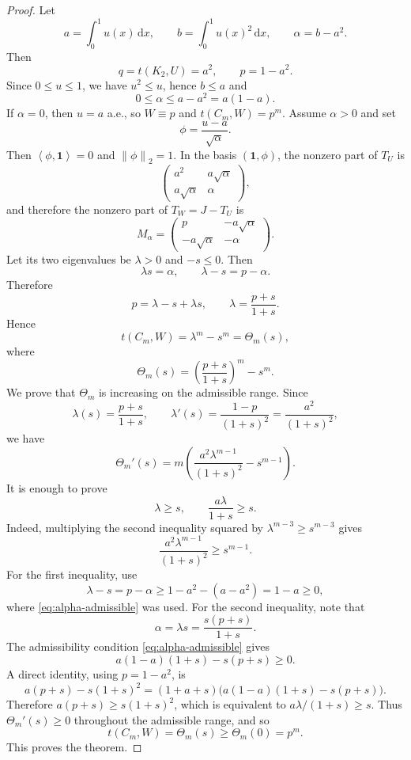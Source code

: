 \documentclass[11pt]{article}
\theoremstyle{definition}
\theoremstyle{remark}
\newcommand{\one}{\mathbf 1}
\newcommand{\ip}[2]{\left\langle #1,#2\right\rangle}
\newcommand{\norm}[1]{\left\lVert #1\right\rVert}
\newcommand{\dd}{\,\mathrm d}
\newcommand{\0}{\mathbf 0}
\begin{document}
\begin{proof}
Let
\[
        a=\int_0^1 u(x)\dd x,
        \qquad
        b=\int_0^1 u(x)^2\dd x,
        \qquad
        \alpha=b-a^2.
\]
Then
\[
        q=t(K_2,U)=a^2,
        \qquad
        p=1-a^2.
\]
Since $0\le u\le1$, we have $u^2\le u$, hence $b\le a$ and
\begin{equation}\label{eq:alpha-admissible}
        0\le \alpha\le a-a^2=a(1-a).
\end{equation}
If $\alpha=0$, then $u=a$ a.e., so $W\equiv p$ and $t(C_m,W)=p^m$.  Assume $\alpha>0$ and set
\[
        \phi=\frac{u-a}{\sqrt\alpha}.
\]
Then $\ip{\phi}{\one}=0$ and $\norm\phi_2=1$.  In the basis $(\one,\phi)$, the nonzero part of $T_U$ is
\[
        \begin{pmatrix}
        a^2 & a\sqrt\alpha\\
        a\sqrt\alpha & \alpha
        \end{pmatrix},
\]
and therefore the nonzero part of $T_W=J-T_U$ is
\[
        M_\alpha=
        \begin{pmatrix}
        p & -a\sqrt\alpha\\
        -a\sqrt\alpha & -\alpha
        \end{pmatrix}.
\]
Let its two eigenvalues be $\lambda>0$ and $-s\le0$.  Then
\[
        \lambda s=\alpha,
        \qquad
        \lambda-s=p-\alpha.
\]
Therefore
\[
        p=\lambda-s+\lambda s,
        \qquad
        \lambda=\frac{p+s}{1+s}.
\]
Hence
\[
        t(C_m,W)=\lambda^m-s^m
        =\Theta_m(s),
\]
where
\[
        \Theta_m(s)=\left(\frac{p+s}{1+s}\right)^m-s^m.
\]
We prove that $\Theta_m$ is increasing on the admissible range.  Since
\[
        \lambda(s)=\frac{p+s}{1+s},
        \qquad
        \lambda'(s)=\frac{1-p}{(1+s)^2}=\frac{a^2}{(1+s)^2},
\]
we have
\[
        \Theta_m'(s)
        =m\left(\frac{a^2\lambda^{m-1}}{(1+s)^2}-s^{m-1}\right).
\]
It is enough to prove
\begin{equation}\label{eq:rank-one-derivative-conditions}
        \lambda\ge s,
        \qquad
        \frac{a\lambda}{1+s}\ge s.
\end{equation}
Indeed, multiplying the second inequality squared by $\lambda^{m-3}\ge s^{m-3}$ gives
\[
        \frac{a^2\lambda^{m-1}}{(1+s)^2}\ge s^{m-1}.
\]
For the first inequality, use
\[
        \lambda-s=p-\alpha
        \ge 1-a^2-(a-a^2)=1-a\ge0,
\]
where \eqref{eq:alpha-admissible} was used.  For the second inequality, note that
\[
        \alpha=\lambda s=\frac{s(p+s)}{1+s}.
\]
The admissibility condition \eqref{eq:alpha-admissible} gives
\[
        a(1-a)(1+s)-s(p+s)\ge0.
\]
A direct identity, using $p=1-a^2$, is
\[
        a(p+s)-s(1+s)^2
        =(1+a+s)\bigl(a(1-a)(1+s)-s(p+s)\bigr).
\]
Therefore $a(p+s)\ge s(1+s)^2$, which is equivalent to $a\lambda/(1+s)\ge s$.  Thus $\Theta_m'(s)\ge0$ throughout the admissible range, and so
\[
        t(C_m,W)=\Theta_m(s)\ge\Theta_m(0)=p^m.
\]
This proves the theorem.
\end{proof}
\end{document}
